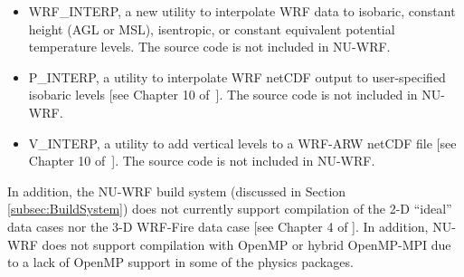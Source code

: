 \begin{itemize}
\item WRF\_INTERP, a new utility to interpolate WRF data to isobaric, 
constant height (AGL or MSL), isentropic, or constant equivalent potential
temperature levels.  The source code is not included in NU-WRF.

\item P\_INTERP, a utility to interpolate WRF netCDF output to user-specified
isobaric levels [see Chapter 10 of~\cite{ref:ArwUserGuide}]. The source code 
is not included in NU-WRF.

\item V\_INTERP, a utility to add vertical levels to a WRF-ARW netCDF file 
[see Chapter 10 of~\cite{ref:ArwUserGuide}]. The source code is not included
in NU-WRF.

\end{itemize}

In addition, the NU-WRF build system (discussed in Section 
\ref{subsec:BuildSystem}) does not currently support compilation of the 2-D
``ideal'' data cases nor the 3-D WRF-Fire data case [see Chapter 4 of 
\cite{ref:ArwUserGuide}].  In addition, NU-WRF does not support 
compilation with OpenMP or hybrid OpenMP-MPI due to a lack of OpenMP support 
in some of the physics packages.

